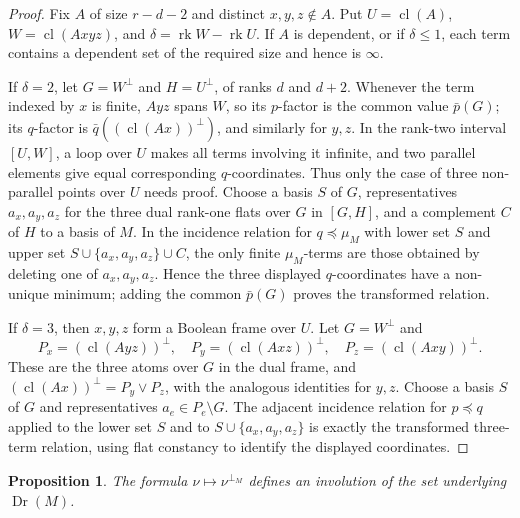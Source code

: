 \documentclass[12pt]{article}
\newcommand{\Dr}{\operatorname{Dr}}
\newcommand{\rk}{\operatorname{rk}}
\newcommand{\cl}{\operatorname{cl}}
\newtheorem{proposition}{Proposition}
\begin{document}
\begin{proof}
Fix $A$ of size $r-d-2$ and distinct $x,y,z\notin A$.  Put
$U=\cl(A)$, $W=\cl(Axyz)$, and $\delta=\rk W-\rk U$.  If $A$ is
dependent, or if $\delta\le1$, each term contains a dependent set of the
required size and hence is $\infty$.

If $\delta=2$, let $G=W^\perp$ and $H=U^\perp$, of ranks $d$ and
$d+2$.  Whenever the term indexed by $x$ is finite, $Ayz$ spans $W$,
so its $p$-factor is the common value $\bar p(G)$; its $q$-factor is
$\bar q((\cl(Ax))^\perp)$, and similarly for $y,z$.  In the rank-two
interval $[U,W]$, a loop over $U$ makes all terms involving it
infinite, and two parallel elements give equal corresponding
$q$-coordinates.  Thus only the case of three non-parallel points over
$U$ needs proof.  Choose a basis $S$ of $G$, representatives
$a_x,a_y,a_z$ for the three dual rank-one flats over $G$ in $[G,H]$,
and a complement $C$ of $H$ to a basis of $M$.  In the incidence
relation for $q\preceq\mu_M$ with lower set $S$ and upper set
$S\cup\{a_x,a_y,a_z\}\cup C$, the only finite $\mu_M$-terms are those
obtained by deleting one of $a_x,a_y,a_z$.  Hence the three displayed
$q$-coordinates have a non-unique minimum; adding the common
$\bar p(G)$ proves the transformed relation.

If $\delta=3$, then $x,y,z$ form a Boolean frame over $U$.  Let
$G=W^\perp$ and
\[
 P_x=(\cl(Ayz))^\perp,\quad P_y=(\cl(Axz))^\perp,\quad
 P_z=(\cl(Axy))^\perp .
\]
These are the three atoms over $G$ in the dual frame, and
$(\cl(Ax))^\perp=P_y\vee P_z$, with the analogous identities for
$y,z$.  Choose a basis $S$ of $G$ and representatives
$a_e\in P_e\setminus G$.  The adjacent incidence relation for
$p\preceq q$ applied to the lower set $S$ and to
$S\cup\{a_x,a_y,a_z\}$ is exactly the transformed three-term relation,
using flat constancy to identify the displayed coordinates.
\end{proof}

\begin{proposition}\label{prop:set}
The formula $\nu\mapsto\nu^{\perp_M}$ defines an involution of the set
underlying $\Dr(M)$.
\end{proposition}
\end{document}
